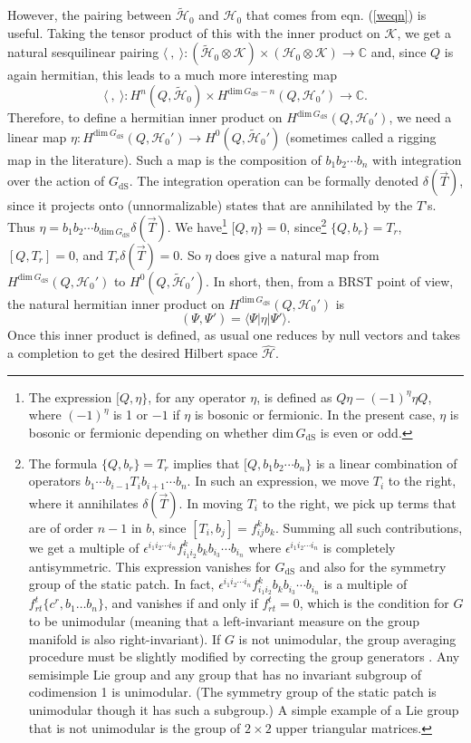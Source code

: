 \documentclass[11pt,a4paper]{article}
\def\t{{ \sf t}}
\def\dim{{\mathrm{dim}}}
\def\be{\begin{equation}}
\def\ee{\end{equation}}
\def\h{\widehat}
\def\K{{\mathcal K}}
\def\C{{\mathbb C}}
\def\[{\bigl [}
\def\t{\widetilde }
\def\h{\widehat}
\def\H{{\mathcal H}}
\def\dS{{\mathrm{dS}}}
\def\la{\langle}
\def\ra{\rangle}
\begin{document}
However, the pairing between $\t \H_0$ and $\H_0$ that comes from eqn. (\ref{weqn}) is useful.  Taking the tensor product of this
with the inner product on $\K$, we 
get a natural sesquilinear pairing $\la~,~\ra: (\t \H_0\otimes \K) \times (\H_0\otimes \K)\to \C$ and, since $Q$ is again hermitian, this 
leads to a much more interesting map 
\be\label{oregon} \la~,~\ra: H^n(Q, \t \H_0)\times H^{\dim\, G_\dS-n}(Q,\H_0') \to \C.\ee
Therefore, to define a hermitian inner product on $H^{\dim\,G_\dS}(Q,\H_0')$, we  need a linear map $\eta:H^{\dim \,G_\dS}(Q,\H_0')\to  H^0(Q,\t\H_0') $ (sometimes called a rigging map in the literature).
Such a map is the composition of $b_1 b_2\cdots b_n$ with integration over the action of $G_\dS$.  The integration operation can be formally denoted
$\delta(\vec T)$, since it projects onto (unnormalizable) states that are annihilated by the $T$'s.   Thus $\eta=b_1 b_2 \cdots b_{\dim\,G_\dS}\delta(\vec T)$.
We have\footnote{The expression 
$[Q,\eta\}$, for any operator $\eta$,  is defined as $Q\eta-(-1)^\eta\eta Q$, where $(-1)^\eta$ is 1 or $-1$ if $\eta$ is bosonic or fermionic.  In the present case,
$\eta$ is bosonic or fermionic depending on whether $\dim\,G_\dS$ is even or odd.} 
 $[Q,\eta\}=0$, since\footnote{\label{unimodular}The formula $\{Q,b_r\}=T_r$ implies that $\[Q,b_1 b_2\cdots b_n\}$ is a linear combination of operators
 $b_1 \cdots b_{i-1} T_i b_{i+1}\cdots b_n$.  In such an expression, we move $T_i$ to the right, where it annihilates $\delta(\vec T)$.   In moving
 $T_i$ to the right, we pick up terms that are of order $n-1$ in $b$, since 
$[T_i,b_j]=f^k_{ij} b_k$.  Summing all such contributions, we get a multiple of
$\epsilon^{i_1 i_2\cdots i_n}f_{i_1 i_2}^k b_k b_{i_3}\cdots b_{i_n}$ where $\epsilon^{i_1 i_2\cdots i_n}$ is completely antisymmetric.
This expression vanishes for  $G_\dS$ and also for the symmetry group of the static patch.   In fact, $\epsilon^{i_1 i_2\cdots i_n}f_{i_1 i_2}^k b_k b_{i_3}\cdots b_{i_n}$ 
is a multiple of $ f^t_{rt}\{c^r, b_1 \dots b_n\}$, and vanishes if and only if $f^t_{rt}=0$, which is the condition for $G$ to be unimodular (meaning that a left-invariant measure
on the group manifold is also right-invariant).
If $G$ is not unimodular, the group averaging procedure must be slightly modified by correcting the group generators \cite{MarolfReview}.  Any semisimple Lie group and
any group that has no invariant subgroup of codimension 1 is unimodular. (The symmetry group of the static patch is unimodular though it has such a subgroup.)  A simple example
of a Lie group that is not unimodular is the group of $2\times 2$ upper triangular matrices.  
}
$\{Q,b_r\}=T_r$, $[Q,T_r]=0$, and $T_r\delta(\vec T)=0$.  So $\eta$ does give a natural map from $H^{\dim\,G_\dS}(Q,\H_0')$ to
$H^0(Q,\t\H_0')$.   In short, then, from a BRST point of view, the natural hermitian inner product on $H^{\dim\,G_\dS}(Q,\H_0')$ is
\be\label{zoltan} (\Psi,\Psi')=\la\Psi|\eta|\Psi'\ra. \ee
Once this inner product is defined, as usual one reduces by null vectors and takes a completion to get the desired Hilbert space $\h\H$.
\end{document}
